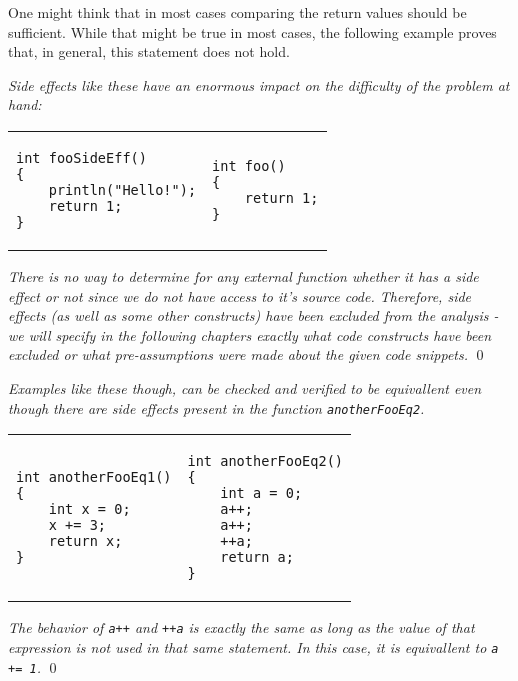 One might think that in most cases comparing the return values should be sufficient. While that might be true in most cases, the following example proves that, in general, this statement does not hold.

\begin{exmp}
\textit{Side effects like these have an enormous impact on the difficulty of the problem at hand:}

\begin{tabular}{ p{4.5cm} p{4.5cm} }
\begin{lstlisting}
int fooSideEff()
{
    println("Hello!");
    return 1;
}
\end{lstlisting}
&
\begin{lstlisting}
int foo()
{
    return 1;
}
\end{lstlisting}
\end{tabular}

\textit{There is no way to determine for any external function whether it has a side effect or not since we do not have access to it's source code. Therefore, side effects (as well as some other constructs) have been excluded from the analysis - we will specify in the following chapters exactly what code constructs have been excluded or what pre-assumptions were made about the given code snippets.}
\qed
\end{exmp}

\begin{exmp}
\textit{Examples like these though, can be checked and verified to be equivallent even though there are side effects present in the function \texttt{anotherFooEq2}.}

\begin{tabular}{ p{4.5cm} p{4.5cm} }
\begin{lstlisting}
int anotherFooEq1()
{
    int x = 0;
    x += 3;
    return x;
}
\end{lstlisting}
&
\begin{lstlisting}
int anotherFooEq2()
{
    int a = 0;
    a++;
    a++;
    ++a;
    return a;
}
\end{lstlisting}
\label{exmp:PlusPlusExample}
\end{tabular}

\textit{The behavior of \texttt{a++} and \texttt{++a} is exactly the same as long as the value of that expression is not used in that same statement. In this case, it is equivallent to \texttt{a += 1}.}
\qed
\end{exmp}

